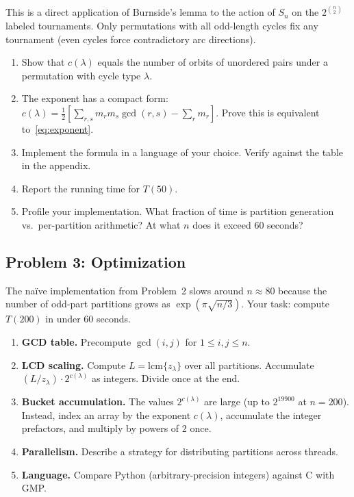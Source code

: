 \documentclass[11pt,letterpaper]{article}
\theoremstyle{definition}
\begin{document}
\noindent This is a direct application of Burnside's lemma to the action of $S_n$ on the $2^{\binom{n}{2}}$ labeled tournaments. Only permutations with all odd-length cycles fix any tournament (even cycles force contradictory arc directions).

\begin{enumerate}[label=(\alph*)]
  \item Show that $c(\lambda)$ equals the number of orbits of unordered pairs under a permutation with cycle type $\lambda$.
  \item The exponent has a compact form: $c(\lambda) = \frac{1}{2}[\sum_{r,s} m_r m_s \gcd(r,s) - \sum_r m_r]$. Prove this is equivalent to~\eqref{eq:exponent}.
  \item Implement the formula in a language of your choice. Verify against the table in the appendix.
  \item Report the running time for $T(50)$.
  \item Profile your implementation. What fraction of time is partition generation vs.\ per-partition arithmetic? At what $n$ does it exceed 60 seconds?
\end{enumerate}

\bigskip


\subsection*{Problem 3: Optimization \hfill \normalfont [25 points]}

The na\"ive implementation from Problem~2 slows around $n \approx 80$ because the number of odd-part partitions grows as $\exp(\pi\sqrt{n/3})$. Your task: compute $T(200)$ in under 60 seconds.

\begin{enumerate}[label=(\alph*)]
  \item \textbf{GCD table.} Precompute $\gcd(i,j)$ for $1 \leq i,j \leq n$.
  \item \textbf{LCD scaling.} Compute $L = \mathrm{lcm}\{z_\lambda\}$ over all partitions. Accumulate $(L/z_\lambda) \cdot 2^{c(\lambda)}$ as integers. Divide once at the end.
  \item \textbf{Bucket accumulation.} The values $2^{c(\lambda)}$ are large (up to $2^{19900}$ at $n = 200$). Instead, index an array by the exponent $c(\lambda)$, accumulate the integer prefactors, and multiply by powers of 2 once.
  \item \textbf{Parallelism.} Describe a strategy for distributing partitions across threads.
  \item \textbf{Language.} Compare Python (arbitrary-precision integers) against C with GMP.
\end{enumerate}
\end{document}

